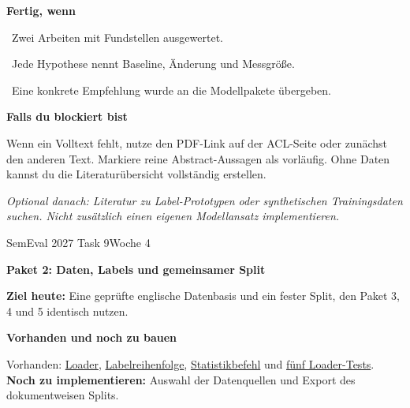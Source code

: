 \documentclass[10pt,a4paper]{article}
\newcommand{\checkbox}{\fbox{\rule{0pt}{2.4mm}\hspace{2.4mm}}}
\newcommand{\planheading}[1]{\par\vspace{9pt}\textbf{#1}\par\vspace{3pt}}
\newcommand{\repolink}[2]{\href{https://github.com/jonaidaydi/semeval-2027-task9-framing/blob/main/#1}{#2}}
\newcommand{\followuptitle}[1]{%
  {\small SemEval 2027 Task 9\hfill Woche 4\par}%
  \vspace{6pt}%
  {\fontsize{16}{19}\selectfont\bfseries #1\par}%
  \vspace{8pt}%
}
\begin{document}
\planheading{Fertig, wenn}
\checkbox\ Zwei Arbeiten mit Fundstellen ausgewertet.\par
\checkbox\ Jede Hypothese nennt Baseline, Änderung und Messgröße.\par
\checkbox\ Eine konkrete Empfehlung wurde an die Modellpakete übergeben.

\planheading{Falls du blockiert bist}
Wenn ein Volltext fehlt, nutze den PDF-Link auf der ACL-Seite oder zunächst den anderen Text.
Markiere reine Abstract-Aussagen als vorläufig. Ohne Daten kannst du die Literaturübersicht vollständig erstellen.

\vfill
\textit{Optional danach: Literatur zu Label-Prototypen oder synthetischen Trainingsdaten suchen.
Nicht zusätzlich einen eigenen Modellansatz implementieren.}

\newpage
\hypertarget{plan-daten}{}
\followuptitle{Paket 2: Daten, Labels und gemeinsamer Split}
\textbf{Ziel heute:} Eine geprüfte englische Datenbasis und ein fester Split, den Paket 3, 4 und 5 identisch nutzen.

\planheading{Vorhanden und noch zu bauen}
Vorhanden: \repolink{src/semeval_framing/data.py}{Loader},
\repolink{src/semeval_framing/labels.py}{Labelreihenfolge},
\repolink{src/semeval_framing/cli.py}{Statistikbefehl} und
\repolink{tests/test_data.py}{fünf Loader-Tests}.
\textbf{Noch zu implementieren:} Auswahl der Datenquellen und Export des dokumentweisen Splits.
\end{document}
